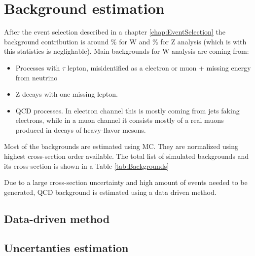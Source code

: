 \chapter{Background estimation}
After the event selection described in a chapter \ref{chap:EventSelection} the background contribution is around \% for W and \% for Z analysis (which is with this statistics is  neglighable). Main backgrounds for W analysis are coming from:
\begin{itemize}
\item Processes with $\tau$ lepton, misidentified as a electron or muon + missing energy from neutrino
\item Z decays with one missing lepton.
\item QCD processes. In electron channel this is mostly coming from jets faking electrons, while in a muon channel it consists mostly of a real muons produced in decays of heavy-flavor mesons. %
\end{itemize}
Most of the backgrounds are estimated using MC. They are normalized using highest cross-section order available. The total list of simulated backgrounds and its cross-section is shown in a Table \ref{tab:Backgrounds}

Due to a large cross-section uncertainty and high amount of events needed to be generated, QCD background is estimated using a data driven method. 
\section{Data-driven method}

\section{Uncertanties estimation}